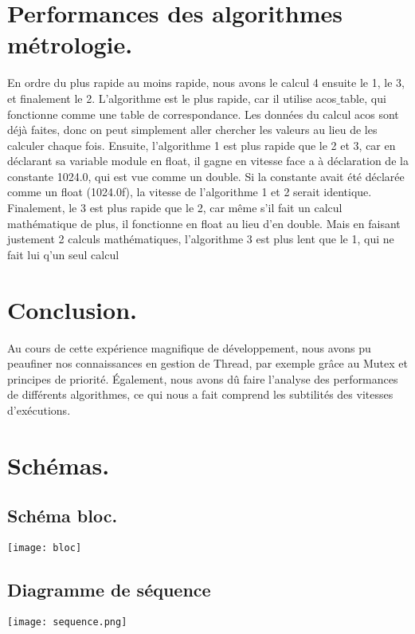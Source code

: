 \documentclass[12pt]{article}
\begin{document}
\section{Performances des algorithmes métrologie.}
En ordre du plus rapide au moins rapide, nous avons le calcul 4 ensuite le 1, le 3, et finalement le 2. L'algorithme  est le plus rapide, car il utilise acos$\_$table, qui fonctionne comme une table de correspondance. Les données du calcul acos sont déjà faites, donc on peut simplement aller chercher les valeurs au lieu de les calculer chaque fois. Ensuite, l'algorithme 1 est plus rapide que le 2 et 3, car en déclarant sa variable module en float, il gagne en vitesse face a à déclaration de la constante 1024.0, qui est vue comme un double. Si la constante avait été déclarée comme un float (1024.0f), la vitesse de l'algorithme 1 et 2 serait identique. Finalement, le 3 est plus rapide que le 2, car même s'il fait un calcul mathématique de plus, il fonctionne en float au lieu d'en double. Mais en faisant justement 2 calculs mathématiques, l'algorithme 3 est plus lent que le 1, qui ne fait lui q'un seul calcul \section{Conclusion.}
Au cours de cette expérience magnifique de développement, nous avons pu peaufiner nos connaissances en gestion de Thread, par exemple grâce au Mutex et principes de priorité. Également, nous avons dû faire l'analyse des performances de différents algorithmes, ce qui nous a fait comprend les subtilités des vitesses d'exécutions. 
\section{Schémas.}
\subsection{Schéma bloc.}
\texttt{[image: bloc]}
\subsection{Diagramme de séquence}
\texttt{[image: sequence.png]}
\end{document}
